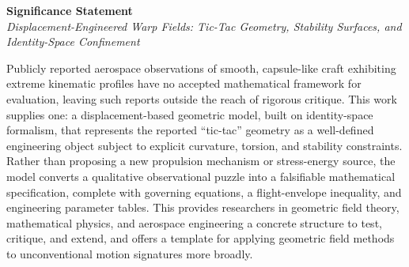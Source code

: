 \documentclass[11pt]{article}
\begin{document}
\pagestyle{empty}

\begin{center}
\textbf{Significance Statement}\\[0.3em]
\textit{Displacement-Engineered Warp Fields: Tic-Tac Geometry, Stability Surfaces, and Identity-Space Confinement}
\end{center}

\vspace{0.5em}

Publicly reported aerospace observations of smooth, capsule-like craft exhibiting extreme kinematic profiles have no accepted mathematical framework for evaluation, leaving such reports outside the reach of rigorous critique. This work supplies one: a displacement-based geometric model, built on identity-space formalism, that represents the reported ``tic-tac'' geometry as a well-defined engineering object subject to explicit curvature, torsion, and stability constraints. Rather than proposing a new propulsion mechanism or stress-energy source, the model converts a qualitative observational puzzle into a falsifiable mathematical specification, complete with governing equations, a flight-envelope inequality, and engineering parameter tables. This provides researchers in geometric field theory, mathematical physics, and aerospace engineering a concrete structure to test, critique, and extend, and offers a template for applying geometric field methods to unconventional motion signatures more broadly.
\end{document}
